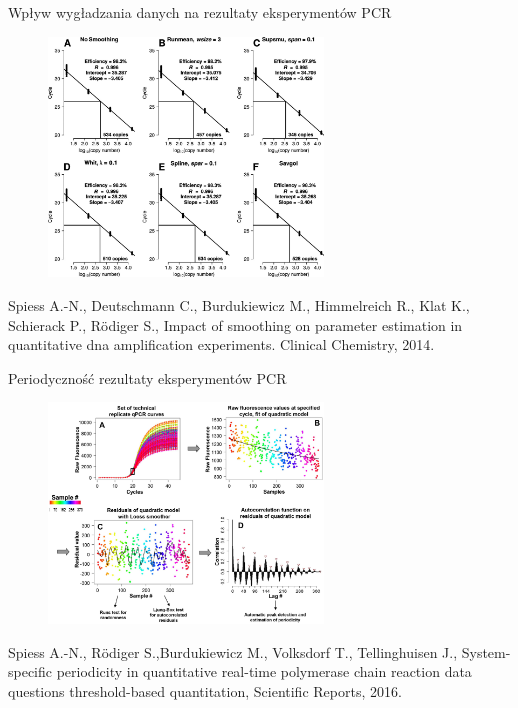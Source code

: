 \documentclass{beamer}\usepackage[]{graphicx}\usepackage[]{color}
\begin{document}
\begin{frame}{Wpływ wygładzania danych na rezultaty eksperymentów PCR}
\begin{figure} 
\includegraphics[width=0.65\textwidth]{static_figure/smoothing.png}
\end{figure}

\tiny Spiess A.-N., Deutschmann C., Burdukiewicz M., Himmelreich 
R., 
Klat K., Schierack P., R\"{o}diger S., Impact of smoothing on parameter 
estimation in quantitative dna amplification experiments. Clinical 
Chemistry, 2014.

\end{frame}


\begin{frame}{Periodyczność rezultaty eksperymentów PCR}
\begin{figure} 
\includegraphics[width=0.65\textwidth]{static_figure/period.png}
\end{figure}

\tiny Spiess A.-N., R\"{o}diger S.,Burdukiewicz M., Volksdorf T., 
Tellinghuisen J., System-
specific periodicity in quantitative real-time polymerase chain reaction data 
questions
threshold-based quantitation, Scientific Reports, 2016.

\end{frame}
\end{document}
